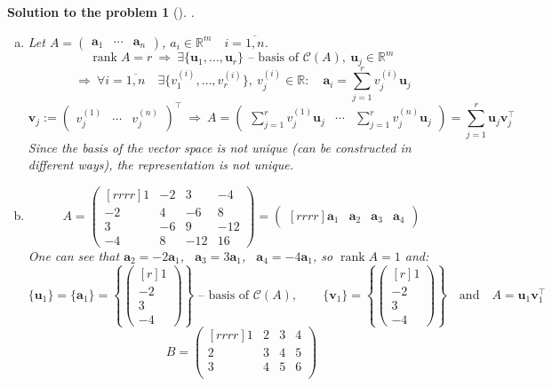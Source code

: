 \documentclass[12pt,a4]{article}
\newtheorem{solution}{Solution to the problem}
\newcommand\rank{\operatorname{rank}}
\newcommand{\bR}{{\mathbb R}}
\newcommand{\ba}{{\mathbf a}}
\newcommand{\bu}{{\mathbf u}}
\newcommand{\bv}{{\mathbf v}}
\renewcommand{\Im}{{\mathcal C}}
\begin{document}
\begin{solution}[] \rm .
\begin{enumerate}[(a)]
\item Let $A = \begin{pmatrix}\ba_1 & \cdots & \ba_n \end{pmatrix}$, \quad $a_i \in \bR^m \quad i=\overline{1,n}$.
\[
\rank A = r
~\Rightarrow~
\exists \{\bu_1, \dots, \bu_r \} \text{ -- 	basis of $\Im(A)$}, ~ \bu_j \in \bR^m
\]
\[
~\Rightarrow~
\forall i=\overline{1,n} \quad \exists \{v^{(i)}_1, \dots, v^{(i)}_r\},~  v^{(i)}_j\in\bR: \quad \ba_i = \sum_{j=1}^r v^{(i)}_j \bu_j
\]
\[
\bv_j := \begin{pmatrix}v^{(1)}_j & \cdots & v^{(n)}_j \end{pmatrix}^\top
~\Rightarrow~
A = \begin{pmatrix}\sum_{j=1}^r v^{(1)}_j \bu_j & \cdots & \sum_{j=1}^r v^{(n)}_j \bu_j \end{pmatrix} = \sum_{j=1}^r\bu_j\bv_j^\top
\]
Since the basis of the vector space is not unique (can be constructed in different ways), the representation is not unique.
\item
\[
A =
\begin{pmatrix}[rrrr]
1 & -2 & 3 & -4 \\
-2 & 4 & -6 & 8 \\
3 & -6 & 9 & -12 \\
-4 & 8 & -12 & 16
\end{pmatrix} = \begin{pmatrix}[rrrr] \ba_1 & \ba_2 & \ba_3 & \ba_4 \end{pmatrix} 
\]
One can see that $\ba_2 = -2\ba_1$, ~$\ba_3 = 3\ba_1$, ~$\ba_4 = -4\ba_1$, so $\rank A = 1$ and:
\[
\{\bu_1\} = \{\ba_1\}=\left\{\begin{pmatrix}[r]1\\-2\\3\\-4\end{pmatrix}\right\} \text{ -- basis of $\Im(A)$},
\qquad
\{\bv_1\} = \left\{\begin{pmatrix}[r]1\\-2\\3\\-4\end{pmatrix}\right\}
\quad
\text{and}\quad
A = \bu_1\bv_1^\top
\]
\[
B =
\begin{pmatrix}[rrrr]
1 & 2 & 3 & 4 \\
2 & 3 & 4 & 5 \\
3 & 4 & 5 & 6 \\

\end{pmatrix}\]
\end{enumerate}
\end{solution}
\end{document}
